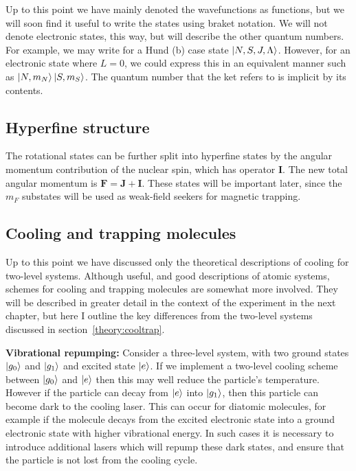 Up to this point we have mainly denoted the wavefunctions as functions, but we
will soon find it useful to write the states using braket notation. We will not
denote electronic states, this way, but will describe the other quantum
numbers. For example, we may write for a Hund (b) case state $\ket{N, S, J,
\Lambda}$. However, for an electronic state where $L=0$, we could express this
in an equivalent manner such as $\ket{N, m_N}\ket{S, m_S}$. The
quantum number that the ket refers to is implicit by its contents.

\subsection{Hyperfine structure}

The rotational states can be further split into hyperfine states by the angular
momentum contribution of the nuclear spin, which has operator $\mathbf{I}$. The
new total angular momentum is  $\mathbf{F} = \mathbf{J} + \mathbf{I}$. These
states will be important later, since the $m_F$ substates will be used as
weak-field seekers for magnetic trapping.

\subsection{Cooling and trapping molecules}

Up to this point we have discussed only the theoretical descriptions of cooling
for two-level systems. Although useful, and good descriptions of atomic
systems, schemes for cooling and trapping molecules are somewhat more involved.
They will be described in greater detail in the context of the \CaF{}
experiment in the next chapter, but here I outline the key differences from the
two-level systems discussed in section~\ref{theory:cooltrap}.

\textbf{Vibrational repumping:} Consider a three-level system, with two ground
states $\ket{g_0}$ and $\ket{g_1}$ and excited state $\ket{e}$. If we implement
a two-level cooling scheme between $\ket{g_0}$ and $\ket{e}$ then this may well
reduce the particle's temperature. However if the particle can decay from
$\ket{e}$ into $\ket{g_1}$, then this particle can become dark to the cooling
laser. This can occur for diatomic molecules, for example if the molecule
decays from the excited electronic state into a ground electronic state with
higher vibrational energy. In such cases it is necessary to introduce
additional lasers which will repump these dark states, and ensure that the
particle is not lost from the cooling cycle.

